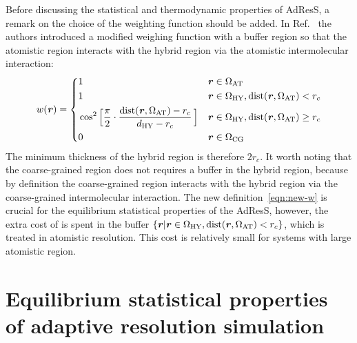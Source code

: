 \documentclass[epjST]{svjour}
\newcommand{\recheck}[1]{{\color{red} #1}}
\newcommand{\vect}[1]{\textbf{\textit{#1}}}
\newcommand{\dist}[0]{\textrm {dist}}
\newcommand{\AT}[0]{\textrm{AT}}
\newcommand{\HY}[0]{\textrm{HY}}
\newcommand{\CG}[0]{\textrm{CG}}
\begin{document}
Before discussing the statistical and thermodynamic properties of AdResS, a remark on the
choice of the weighting function should be added. 
In Ref.~\cite{wang2012adaptive} the authors introduced a modified weighing function with
a buffer region so that the atomistic region
interacts with the hybrid region via the atomistic intermolecular interaction:
\begin{equation}\label{eqn:new-w}
  w(\vect r) =
  \left\{
    \begin{alignedat}{3}
      &1 &\quad& \vect r \in \Omega_\AT\\
      &1 && \vect r \in\Omega_\HY, \dist(\vect r, \Omega_\AT) < r_c \\
      &\cos^2\Big[\frac{\pi}{2 } \cdot \frac{\dist(\vect r, \Omega_\AT) - r_c}{d_{{\HY}} - r_c}\,\Big] && \vect r \in\Omega_\HY, \dist(\vect r, \Omega_\AT) \geq r_c\\
      &0 &    & \vect r \in \Omega_\CG 
    \end{alignedat}
  \right.
\end{equation}
The minimum thickness of the hybrid region is therefore $2r_c$.
It worth noting that the coarse-grained region does not requires a buffer in the hybrid region, because
by definition the coarse-grained region interacts with the hybrid region via the coarse-grained intermolecular interaction.
The new definition~\eqref{eqn:new-w} is crucial for the equilibrium statistical properties of the AdResS,
however, the extra cost of is spent in the buffer $\{\vect r \vert \vect r \in\Omega_\HY, \dist(\vect r, \Omega_\AT) < r_c\}$,
which is treated in atomistic resolution. This cost is relatively small for systems with large atomistic region.


\section{Equilibrium statistical properties of adaptive resolution simulation}
\label{sec:statistical}
\end{document}
